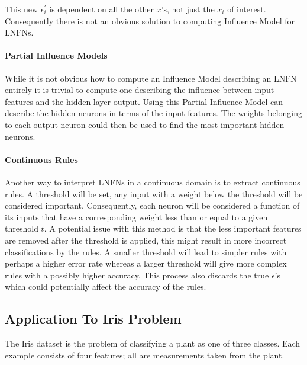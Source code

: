 This new $\epsilon^{'}_i$ is dependent on all the other $x$'s, not just the $x_i$ of interest. Consequently there is not an obvious solution to computing Influence Model for LNFNs.

\paragraph{Partial Influence Models}
While it is not obvious how to compute an Influence Model describing an LNFN entirely it is trivial to compute one describing the influence between input features and the hidden layer output. Using this Partial Influence Model can describe the hidden neurons in terms of the input features. The weights belonging to each output neuron could then be used to find the most important hidden neurons.

\paragraph{Continuous Rules}
Another way to interpret LNFNs in a continuous domain is to extract continuous rules. A threshold will be set, any input with a weight below the threshold will be considered important. Consequently, each neuron will be considered a function of its inputs that have a corresponding weight less than or equal to a given threshold $t$. A potential issue with this method is that the less important features are removed after the threshold is applied, this might result in more incorrect classifications by the rules. A smaller threshold will lead to simpler rules with perhaps a higher error rate whereas a larger threshold will give more complex rules with a possibly higher accuracy. This process also discards the true $\epsilon$'s which could potentially affect the accuracy of the rules.

\subsection{Application To Iris Problem}


The Iris dataset \cite{Lichman:2013} is the problem of classifying a plant as one of three classes. Each example consists of four features; all are measurements taken from the plant.\\

